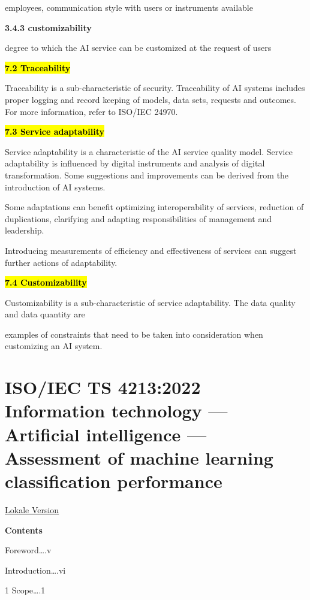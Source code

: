 \documentclass[
  letterpaper,
  DIV=11,
  numbers=noendperiod,
  oneside]{scrreprt}
\begin{document}
\begin{tcolorbox}
employees, communication style with users or instruments available

\textbf{3.4.3 customizability}

degree to which the AI service can be customized at the request of users

\textbf{\hl{7.2 Traceability}}

Traceability is a sub-characteristic of security. Traceability of AI
systems includes proper logging and record keeping of models, data sets,
requests and outcomes. For more information, refer to ISO/IEC 24970.

\textbf{\hl{7.3 Service adaptability}}

Service adaptability is a characteristic of the AI service quality
model. Service adaptability is influenced by digital instruments and
analysis of digital transformation. Some suggestions and improvements
can be derived from the introduction of AI systems.

Some adaptations can benefit optimizing interoperability of services,
reduction of duplications, clarifying and adapting responsibilities of
management and leadership.

Introducing measurements of efficiency and effectiveness of services can
suggest further actions of adaptability.

\textbf{\hl{7.4 Customizability}}

Customizability is a sub-characteristic of service adaptability. The
data quality and data quantity are

examples of constraints that need to be taken into consideration when
customizing an AI system.

\chapter{ISO/IEC TS 4213:2022 Information technology --- Artificial
intelligence --- Assessment of machine learning classification
performance}\label{isoiec-ts-42132022-information-technology-artificial-intelligence-assessment-of-machine-learning-classification-performance}

\href{../SomePDFs/NormenStandards/DIN_ISO_IEC/ISO-IEC\%20TS\%204213_2022-10-00_EN_3394456\%20Assessment\%20of\%20ML\%20classification\%20performancePDF24.pdf}{Lokale
Version}

\textbf{Contents}

Foreword\ldots.v

Introduction\ldots.vi

1 Scope\ldots.1


\end{tcolorbox}
\end{document}
